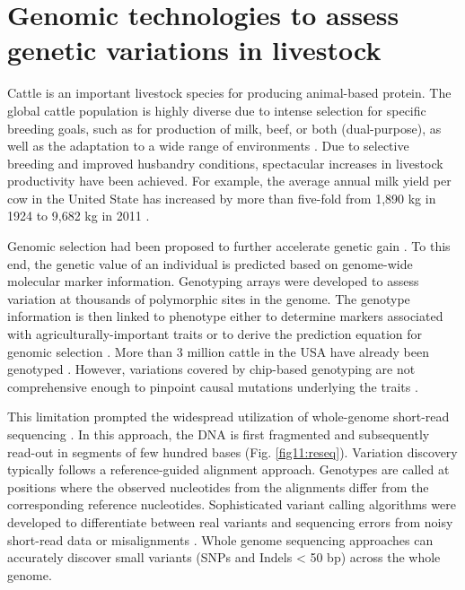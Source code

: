 \documentclass[../main.tex]{subfiles}
\begin{document}
\fi


\graphicspath{{figure/}{../figure/}}

\newpage
\onehalfspacing

\linespread{1.25}
\setlength{\parskip}{\baselineskip}

\normalsize

\section{Genomic technologies to assess genetic variations in livestock}

Cattle is an important livestock species for producing animal-based protein. The global cattle population is highly diverse due to intense selection for specific breeding goals, such as for production of milk, beef, or both (dual-purpose), as well as the adaptation to a wide range of environments \citep{zhang2020evolution}. Due to selective breeding and improved husbandry conditions, spectacular increases in livestock productivity have been achieved. For example, the average annual milk yield per cow in the United State has increased by more than five-fold from 1,890 kg in 1924 to 9,682 kg in 2011 \citep{georges2019harnessing}. 

Genomic selection had been proposed to further accelerate genetic gain \citep{meuwissen2001prediction}. To this end, the genetic value of an individual is predicted based on genome-wide molecular marker information. Genotyping arrays were developed to assess variation at thousands of polymorphic sites in the genome. The genotype information is then linked to phenotype either to determine markers associated with agriculturally-important traits \citep{goddard2009mapping} or to derive the prediction equation for genomic selection \citep{meuwissen2001prediction}. More than 3 million cattle in the USA have already been genotyped \citep{wiggans2017genomic}. However, variations covered by chip-based genotyping  are  not comprehensive enough  to pinpoint causal mutations underlying the traits \citep{pausch2017evaluation}.

This limitation prompted the widespread utilization of whole-genome short-read sequencing . In this approach, the DNA is first fragmented and subsequently read-out in segments of few hundred bases (Fig. \ref{fig11:reseq}). Variation discovery typically follows a reference-guided alignment approach. Genotypes are called at positions where the observed nucleotides from the alignments differ from the corresponding reference nucleotides. Sophisticated variant calling algorithms were developed to differentiate between real variants and sequencing errors from noisy short-read data or misalignments \citep{depristo2011framework}. Whole genome sequencing approaches can accurately discover small variants (SNPs and Indels < 50 bp) across the whole genome. 
\end{document}
